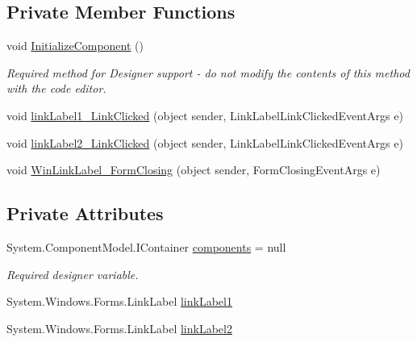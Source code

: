 \subsection*{Private Member Functions}
\begin{DoxyCompactItemize}
\item 
void \hyperlink{class__7___doroshenko__forms2__is52_1_1_win_link_label_a7a9e712d1d3faa8d7ae3f7072d526379}{Initialize\+Component} ()
\begin{DoxyCompactList}\small\item\em Required method for Designer support -\/ do not modify the contents of this method with the code editor. \end{DoxyCompactList}\item 
void \hyperlink{class__7___doroshenko__forms2__is52_1_1_win_link_label_a91ad99163450a8eaf8eadb364697099a}{link\+Label1\+\_\+\+Link\+Clicked} (object sender, Link\+Label\+Link\+Clicked\+Event\+Args e)
\item 
void \hyperlink{class__7___doroshenko__forms2__is52_1_1_win_link_label_ae8a53f496acc807d85022947c551c316}{link\+Label2\+\_\+\+Link\+Clicked} (object sender, Link\+Label\+Link\+Clicked\+Event\+Args e)
\item 
void \hyperlink{class__7___doroshenko__forms2__is52_1_1_win_link_label_af8a160c10849b2c88114b6aab04fff9d}{Win\+Link\+Label\+\_\+\+Form\+Closing} (object sender, Form\+Closing\+Event\+Args e)
\end{DoxyCompactItemize}
\subsection*{Private Attributes}
\begin{DoxyCompactItemize}
\item 
System.\+Component\+Model.\+I\+Container \hyperlink{class__7___doroshenko__forms2__is52_1_1_win_link_label_ad4102c0e46c9ea085c448dd482bbee40}{components} = null
\begin{DoxyCompactList}\small\item\em Required designer variable. \end{DoxyCompactList}\item 
System.\+Windows.\+Forms.\+Link\+Label \hyperlink{class__7___doroshenko__forms2__is52_1_1_win_link_label_a05e097123dfc54e707dc80268fdf855a}{link\+Label1}
\item 
System.\+Windows.\+Forms.\+Link\+Label \hyperlink{class__7___doroshenko__forms2__is52_1_1_win_link_label_aa87df9c5018940e2dbc3bf6c4bf91f25}{link\+Label2}
\end{DoxyCompactItemize}


